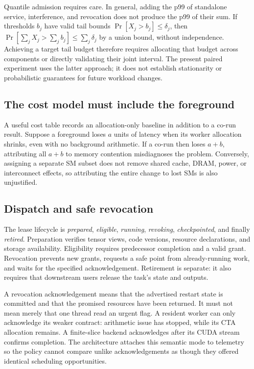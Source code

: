 Quantile admission requires care. In general, adding the p99 of standalone
service, interference, and revocation does not produce the p99 of their sum.
If thresholds $b_j$ have valid tail bounds $\Pr[X_j>b_j]\leq\delta_j$, then
$\Pr[\sum_j X_j>\sum_j b_j]\leq\sum_j\delta_j$ by a union bound, without
independence. Achieving a target tail budget therefore requires allocating
that budget across components or directly validating their joint interval.
The present paired experiment uses the latter approach; it does not establish
stationarity or probabilistic guarantees for future workload changes.

\subsection{The cost model must include the foreground}
A useful cost table records an allocation-only baseline in addition to a
co-run result. Suppose a foreground loses $a$ units of latency when its
worker allocation shrinks, even with no background arithmetic. If a co-run
then loses $a+b$, attributing all $a+b$ to memory contention misdiagnoses the
problem. Conversely, assigning a separate SM subset does not remove shared
cache, DRAM, power, or interconnect effects, so attributing the entire change
to lost SMs is also unjustified.

\subsection{Dispatch and safe revocation}
The lease lifecycle is \emph{prepared}, \emph{eligible}, \emph{running},
\emph{revoking}, \emph{checkpointed}, and finally \emph{retired}. Preparation
verifies tensor views, code versions, resource declarations, and storage
availability. Eligibility requires predecessor completion and a valid grant.
Revocation prevents new grants, requests a safe point from already-running
work, and waits for the specified acknowledgement. Retirement is separate:
it also requires that downstream users release the task's state and outputs.

A revocation acknowledgement means that the advertised restart state is
committed and that the promised resources have been returned. It must not
mean merely that one thread read an urgent flag. A resident worker can only
acknowledge its weaker contract: arithmetic issue has stopped, while its
CTA allocation remains. A finite-slice backend acknowledges after its CUDA
stream confirms completion. The architecture attaches this semantic mode
to telemetry so the policy cannot compare unlike acknowledgements as though
they offered identical scheduling opportunities.

